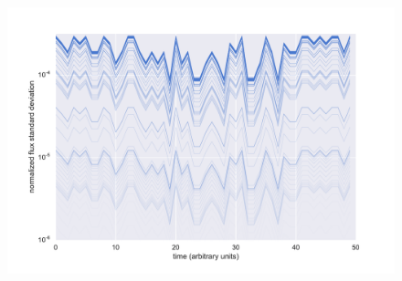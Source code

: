\documentclass[a4paper]{article}
\begin{document}
\begin{figure}[H]
  \centering
  \includegraphics[width=0.75\paperwidth]{./Figures/stdev_timeseries}
\end{figure}
\end{document}
